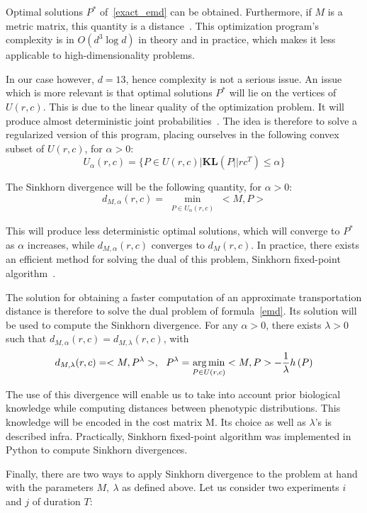 Optimal solutions $P^*$ of~\ref{exact_emd} can be obtained. Furthermore, if $M$ is a metric matrix, this quantity is a distance~\cite{Villani}. This optimization program's complexity is in $O\left( d^3\log d\right) $ in theory and in practice, which makes it less applicable to high-dimensionality problems. 

In our case however, $d=13$, hence complexity is not a serious issue. An issue which is more relevant is that optimal solutions $P^*$ will lie on the vertices of $U(r,c)$. This is due to the linear quality of the optimization problem. It will produce almost deterministic joint probabilities~\cite{sinkhorn}. The idea is therefore to solve a regularized version of this program, placing ourselves in the following convex subset of $U(r,c)$, for $\alpha >0$:
\[
U_\alpha\left( r, c\right) = \{ P \in U\left( r,c \right) | \mathbf{KL}\left(P || rc^T\right)\leqslant \alpha\}
\]

The Sinkhorn divergence will be the following quantity, for $\alpha >0$:
\begin{equation}
d_{M, \alpha}(r,c) = \min_{\substack{P\in U_\alpha (r,c)}} <M,P>
\label{emd}
\end{equation}

This will produce less deterministic optimal solutions, which will converge to $P^*$ as $\alpha$ increases, while $d_{M, \alpha}(r,c)$ converges to $d_{M}(r,c)$. In practice, there exists an efficient method for solving the dual of this problem, Sinkhorn fixed-point algorithm~\cite{sinkhorn_original}. 

The solution for obtaining a faster computation of an approximate transportation distance is therefore to solve the dual problem of formula~\ref{emd}. Its solution will be used to compute the Sinkhorn divergence. For any $\alpha >0$, there exists $\lambda >0$ such that $d_{M, \alpha}(r,c) = d_{M, \lambda}(r,c)$, with
\[
d_{M, \lambda}(r,c) = <M,P^\lambda>,~~ P^\lambda = \operatorname*{arg\,min}_{\substack{P\in U (r,c)}} <M,P> - \dfrac{1}{\lambda} h\left( P\right)
\]

The use of this divergence will enable us to take into account prior biological knowledge while computing distances between phenotypic distributions. This knowledge will be encoded in the cost matrix M. Its choice as well as $\lambda$'s is described infra. Practically, Sinkhorn fixed-point algorithm was implemented in Python to compute Sinkhorn divergences.

Finally, there are two ways to apply Sinkhorn divergence to the problem at hand with the parameters $M,~ \lambda$ as defined above. Let us consider two experiments $i$ and $j$ of duration $T$: 


